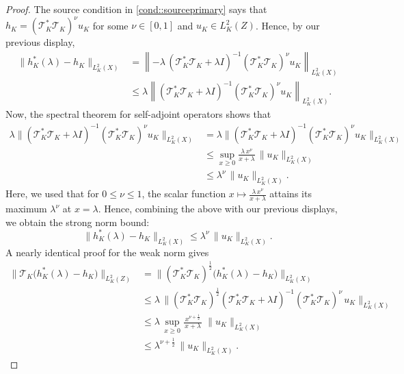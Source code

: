 \documentclass[11pt]{article}
\theoremstyle{plain}
\theoremstyle{definition}
\theoremstyle{remark}
\theoremstyle{definition}
\begin{document}
\begin{proof}
The source condition in  \ref{cond::sourceprimary} says that \(h_K = (\mathcal{T}_{K}^*\mathcal{T}_{K} )^{ \nu} u_K \) for some \(\nu \in [0,1]\) and \(u_K \in L^2_K(Z) \). Hence, by our previous display,
 \begin{align*}
\| h_K^*(\lambda) - h_K \|_{L^2_K(X)}&=   \left\| -\lambda\, \left( \mathcal{T}_K^* \mathcal{T}_K + \lambda I \right)^{-1}  (\mathcal{T}_{K}^*\mathcal{T}_{K} )^{ \nu} u_K\right\|_{L^2_K(X)} \\
&\leq   \lambda \left\|  \left( \mathcal{T}_K^* \mathcal{T}_K + \lambda I \right)^{-1}  (\mathcal{T}_{K}^*\mathcal{T}_{K} )^{ \nu} u_K\right\|_{L^2_K(X)}. 
\end{align*}
Now, the spectral theorem for self-adjoint operators \citep{kato2013perturbation} shows that
\begin{align*}
\lambda \bigl\|   (\mathcal{T}_K^*\mathcal{T}_K + \lambda I)^{-1} (\mathcal{T}_K^*\mathcal{T}_K)^\nu u_K\bigr\|_{L^2_K(X)} &= \lambda \bigl\|   (\mathcal{T}_K^*\mathcal{T}_K + \lambda I)^{-1} (\mathcal{T}_K^*\mathcal{T}_K)^\nu u_K\bigr\|_{L^2_K(X)}\\
&\le  \sup_{x\ge0}\frac{\lambda\,x^\nu}{x + \lambda}\,\|u_K\|_{L^2_K(X)}\\
&\le\lambda^\nu\,\|u_K\|_{L^2_K(X)}.
\end{align*}
Here, we used that for \(0 \le \nu \le 1\), the scalar function $x \mapsto \frac{\lambda\,x^\nu}{x + \lambda}$ attains its maximum \(\lambda^\nu\) at \(x = \lambda\). Hence, combining the above with our previous displays, we obtain the strong norm bound:
 $$\| h_K^*(\lambda) - h_K \|_{L^2_K(X)} \leq    \lambda^\nu\,\|u_K\|_{L^2_K(X)}.$$
 A nearly identical proof for the weak norm gives
\begin{align*}
  \bigl\|\mathcal{T}_K\bigl(h_K^*(\lambda)-h_K\bigr)\bigr\|_{L^2_K(Z)} &=   \bigl\|(\mathcal{T}_K^*\mathcal{T}_K)^{\frac{1}{2}}\bigl(h_K^*(\lambda)-h_K\bigr)\bigr\|_{L^2_K(X)}\\
  &\leq    \lambda\,\bigl\|( \mathcal{T}_K^*\mathcal{T}_K )^{\tfrac12}
      ( \mathcal{T}_K^*\mathcal{T}_K + \lambda I )^{-1}
      ( \mathcal{T}_K^*\mathcal{T}_K )^\nu\,u_K\bigr\|_{L^2_K(X)}\\
  &\le  \lambda\,\sup_{x\ge0}\frac{x^{\nu+\frac12}}{\,x+\lambda\,}\;\|u_K\|_{L^2_K(X)}\\
  &\le  \lambda^{\nu+\frac12}\,\|u_K\|_{L^2_K(X)}.
\end{align*}

\end{proof}
\end{document}
